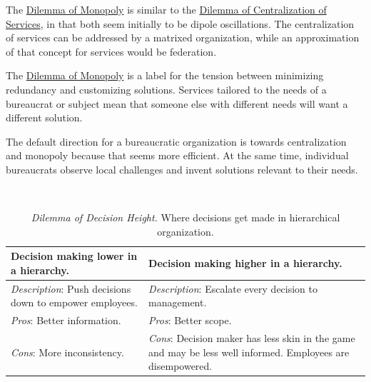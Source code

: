 The \hyperref[table:dilemma-org-market-vs-monopoly]{Dilemma of Monopoly} is similar to the \hyperref[table:dilemma-org-central-vs-distributed]{Dilemma of Centralization of Services}, in that both seem initially to be dipole oscillations. The centralization of services can be addressed by a matrixed organization, while an approximation of that concept for services would be federation. 

The \hyperref[table:dilemma-org-market-vs-monopoly]{Dilemma of Monopoly} is a label for the tension between minimizing redundancy and customizing solutions. Services tailored to the needs of a bureaucrat or subject mean that someone else with different needs will want a different solution. 


The default direction for a bureaucratic organization is towards centralization and monopoly because that seems more efficient. At the same time, individual bureaucrats observe local challenges and invent solutions relevant to their needs.


\ \\

\begin{center}
\begin{table}[H] %
\begin{tabular}{ | m{\dilemmatablewidth}| m{\dilemmatablewidth} | } 
  \hline
  \textbf{Decision making lower in a hierarchy.} &
  \textbf{Decision making higher in a hierarchy.} \\
  \hline
  \textit{Description}: Push decisions down to empower employees. &
  \textit{Description}: Escalate every decision to management. \\  
  \hline
  \textit{Pros}: Better information. &
  \textit{Pros}: Better scope. \\
  \hline
  \textit{Cons}: More inconsistency. & 
  \textit{Cons}: Decision maker has less skin in the game and may be less well informed. Employees are disempowered. \\
  \hline
\end{tabular}
\caption{
\textit{Dilemma of Decision Height.}
Where decisions get made in hierarchical organization.
}
\label{table:dilemma-org-decisions-low-vs-high}
\end{table}
\end{center}

